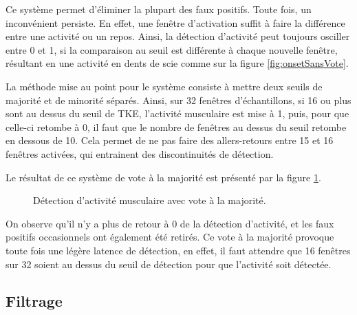 \documentclass[letterpaper, twoside, 12pt, memoire, creativecommons, hyperref]{thETS}
\begin{document}
Ce système permet d'éliminer la plupart des faux positifs. Toute fois, un inconvénient persiste. En effet, une fenêtre d'activation suffit à faire la différence entre une activité ou un repos. Ainsi, la détection d'activité peut toujours osciller entre 0 et 1, si la comparaison au seuil est différente à chaque nouvelle fenêtre, résultant en une activité en dents de scie comme sur la figure \ref{fig:onsetSansVote}.

La méthode mise au point pour le système consiste à mettre deux seuils de majorité et de minorité séparés. Ainsi, sur 32 fenêtres d'échantillons, si 16 ou plus sont au dessus du seuil de TKE, l'activité musculaire est mise à 1, puis, pour que celle-ci retombe à 0, il faut que le nombre de fenêtres au dessus du seuil retombe en dessous de 10. Cela permet de ne pas faire des allers-retours entre 15 et 16 fenêtres activées, qui entrainent des discontinuités de détection.

Le résultat de ce système de vote à la majorité est présenté par la figure \ref{fig:onsetAvecVote}.

\begin{figure}
	\centering
	\caption{Détection d'activité musculaire avec vote à la majorité.}
	\label{fig:onsetAvecVote}
\end{figure}

On observe qu'il n'y a plus de retour à 0 de la détection d'activité, et les faux positifs occasionnels ont également été retirés. Ce vote à la majorité provoque toute fois une légère latence de détection, en effet, il faut attendre que 16 fenêtres sur 32 soient au dessus du seuil de détection pour que l'activité soit détectée.

\subsection{Filtrage}\label{CHfiltrage}
\end{document}
